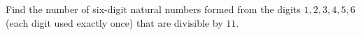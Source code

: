 Find the number of six-digit natural numbers formed from the digits $1, 2, 3, 4, 5, 6$ (each digit used exactly once) that are divisible by $11$.
